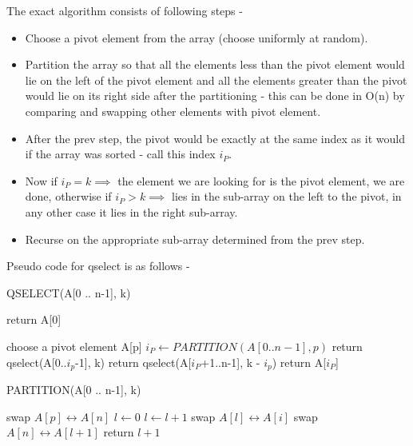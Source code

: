 \documentclass[journal,12pt,twocolumn]{IEEEtran}
\begin{document}
The exact algorithm consists of following steps - 
\begin{itemize}
    \item Choose a pivot element from the array (choose uniformly at random). 
    \item Partition the array so that all the elements less than the pivot element would lie on the left of the pivot element and all the elements greater than the pivot would lie on its right side after the partitioning - this can be done in O(n) by comparing and swapping other elements with pivot element. 
    \item After the prev step, the pivot would be exactly at the same index as it would if the array was sorted - call this index $i_{P}$.
    \item Now if $i_{P} = k \implies$ the element we are looking for is the pivot element, we are done, otherwise if $i_{P} >  k \implies$ lies in the sub-array on  the left to the pivot, in any other case it lies in the right sub-array. 
    \item Recurse on the appropriate sub-array determined from the prev step.
\end{itemize}

Pseudo code for qselect is as follows - 
\begin{algorithm}
\caption{QSELECT(A[0 .. n-1], k)}
\begin{algorithmic}
    \State return A[0]
    
\Else 
    \State choose a pivot element A[p]
    \State $i_{P} \gets PARTITION(A[0..n-1], p)$
        \State return qselect(A[0..$i_{p}$-1], k)
         \State return qselect(A[$i_{P}$+1..n-1], k - $i_{p}$)
    \Else  
        \State return A[$i_{P}$]
    \EndIf
\EndIf

\end{algorithmic}
\end{algorithm}

\begin{algorithm}
\caption{PARTITION(A[0 .. n-1], k)}
\begin{algorithmic}
    \State swap $A[p] \longleftrightarrow A[n]$ 
    \State $l \gets 0 $
        \State $l \gets l+1$
        \State swap $A[l] \longleftrightarrow A[i] $
        \EndIf
    \EndFor
    \State swap $A[n] \longleftrightarrow A[l+1]$
    \State return $l+1$

\end{algorithmic}
\end{algorithm}
\end{document}
